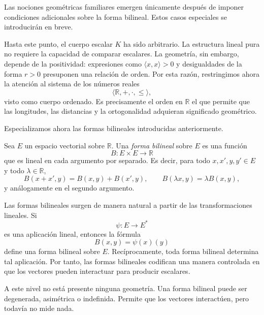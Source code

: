 Las nociones geométricas familiares emergen únicamente después de imponer
condiciones adicionales sobre la forma bilineal.
Estos casos especiales se introducirán en breve.


\medskip

Hasta este punto, el cuerpo escalar $K$ ha sido arbitrario.
La estructura lineal pura no requiere la capacidad de comparar escalares.
La geometría, sin embargo, depende de la positividad: expresiones como
$\langle x,x\rangle > 0$ y desigualdades de la forma $r>0$
presuponen una relación de orden.
Por esta razón, restringimos ahora la atención al sistema de los números reales
\[
\Big\langle \mathbb{R}, +, \cdot, \le \Big\rangle,
\]
visto como cuerpo ordenado.
Es precisamente el orden en $\mathbb{R}$ el que permite que las longitudes,
las distancias y la ortogonalidad adquieran significado geométrico.

\medskip

Especializamos ahora las formas bilineales introducidas anteriormente.

\medskip

Sea $E$ un espacio vectorial sobre $\mathbb{R}$.
Una \emph{forma bilineal} sobre $E$ es una función
\[
B : E \times E \longrightarrow \mathbb{R}
\]
que es lineal en cada argumento por separado.
Es decir, para todo $x,x',y,y' \in E$ y todo $\lambda \in \mathbb{R}$,
\[
B(x+x',y)=B(x,y)+B(x',y), \qquad
B(\lambda x,y)=\lambda B(x,y),
\]
y análogamente en el segundo argumento.

\medskip

Las formas bilineales surgen de manera natural a partir de las transformaciones lineales.
Si
\[
\psi : E \longrightarrow E^*
\]
es una aplicación lineal, entonces la fórmula
\[
B(x,y) = \psi(x)(y)
\]
define una forma bilineal sobre $E$.
Recíprocamente, toda forma bilineal determina tal aplicación.
Por tanto, las formas bilineales codifican una manera controlada en que los
vectores pueden interactuar para producir escalares.

\medskip

A este nivel no está presente ninguna geometría.
Una forma bilineal puede ser degenerada, asimétrica o indefinida.
Permite que los vectores interactúen, pero todavía no mide nada.

